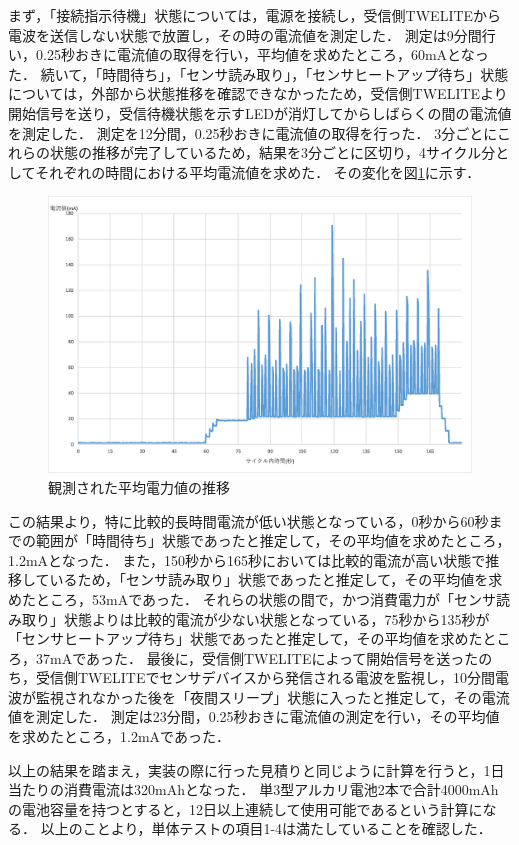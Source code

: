 まず，「接続指示待機」状態については，電源を接続し，受信側TWELITEから電波を送信しない状態で放置し，その時の電流値を測定した．
測定は9分間行い，0.25秒おきに電流値の取得を行い，平均値を求めたところ，60mAとなった．
続いて，「時間待ち」，「センサ読み取り」，「センサヒートアップ待ち」状態については，外部から状態推移を確認できなかったため，受信側TWELITEより開始信号を送り，受信待機状態を示すLEDが消灯してからしばらくの間の電流値を測定した．
測定を12分間，0.25秒おきに電流値の取得を行った．
3分ごとにこれらの状態の推移が完了しているため，結果を3分ごとに区切り，4サイクル分としてそれぞれの時間における平均電流値を求めた．
その変化を図\ref{tuujou_denryoku}に示す．
\begin{figure}[htbp]
    \centering
    \includegraphics[width = 15cm]{./picture/tuujou_dennryoku.eps}
    \caption{観測された平均電力値の推移}
    \label{tuujou_denryoku}
\end{figure}
この結果より，特に比較的長時間電流が低い状態となっている，0秒から60秒までの範囲が「時間待ち」状態であったと推定して，その平均値を求めたところ，1.2mAとなった．
また，150秒から165秒においては比較的電流が高い状態で推移しているため，「センサ読み取り」状態であったと推定して，その平均値を求めたところ，53mAであった．
それらの状態の間で，かつ消費電力が「センサ読み取り」状態よりは比較的電流が少ない状態となっている，75秒から135秒が「センサヒートアップ待ち」状態であったと推定して，その平均値を求めたところ，37mAであった．
最後に，受信側TWELITEによって開始信号を送ったのち，受信側TWELITEでセンサデバイスから発信される電波を監視し，10分間電波が監視されなかった後を「夜間スリープ」状態に入ったと推定して，その電流値を測定した．
測定は23分間，0.25秒おきに電流値の測定を行い，その平均値を求めたところ，1.2mAであった．

以上の結果を踏まえ，実装の際に行った見積りと同じように計算を行うと，1日当たりの消費電流は320mAhとなった．
単3型アルカリ電池2本で合計4000mAhの電池容量を持つとすると，12日以上連続して使用可能であるという計算になる．
以上のことより，単体テストの項目1-4は満たしていることを確認した．

